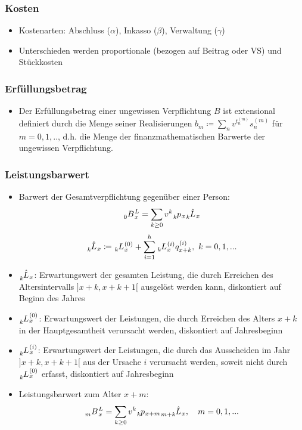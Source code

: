 \documentclass[12pt]{report}
\theoremstyle{dotless}
\theoremstyle{definition}
\begin{document}
\subsubsection{Kosten}
\begin{itemize}
	\item Kostenarten: Abschluss ($\alpha$), Inkasso ($\beta$), Verwaltung ($\gamma$)
	\item Unterschieden werden proportionale (bezogen auf Beitrag oder VS) und Stückkosten
\end{itemize}

\subsubsection{Erfüllungsbetrag}
\begin{itemize}
	\item Der Erfüllungsbetrag einer ungewissen Verpflichtung $B$ ist extensional definiert durch die Menge seiner Realisierungen $b_m \coloneqq \sum_n v^{t_n^{(m)}}s_n^{(m)}$ für $m=0,1,..$, d.h. die Menge der finanzmathematischen Barwerte der ungewissen Verpflichtung.
\end{itemize}

\subsubsection{Leistungsbarwert}
\begin{itemize}
	\item Barwert der Gesamtverpflichtung gegenüber einer Person: 
	\begin{equation}
		\tensor[_{0}]{B}{}_x^{L}= \sum_{k\geq 0}v^k \tensor[_{k}]{p}{}_x \tensor[_{k}]{\hat{L}}{}_x
	\end{equation}
	\begin{equation}
		\tensor[_{k}]{\hat{L}}{}_x \coloneqq	\tensor[_{k}]{L}{}_x^{(0)}+\sum_{i=1}^h \tensor[_{k}]{L}{}_x^{(i)}q_{x+k}^{(i)}, \ k = 0,1,...
	\end{equation}
	\item $\tensor[_{k}]{\hat{L}}{}_x$: Erwartungswert der gesamten Leistung, die durch Erreichen des Altersintervalls $]x+k,x+k+1[$ ausgelöst werden kann, diskontiert auf Beginn des Jahres
	\item $\tensor[_{k}]{L}{}_x^{(0)}$: Erwartungswert der Leistungen, die durch Erreichen des Alters $x+k$ in der Hauptgesamtheit verursacht werden, diskontiert auf Jahresbeginn
	\item $\tensor[_{k}]{L}{}_x^{(i)}$: Erwartungswert der Leistungen, die durch das Ausscheiden im Jahr $]x+k, x+k+1[$ aus der Ursache $i$ verursacht werden, soweit nicht durch $\tensor[_{k}]{L}{}_x^{(0)}$ erfasst, diskontiert auf Jahresbeginn
	\item Leistungsbarwert zum Alter $x+m$:
	\begin{equation}
		\tensor[_{m}]{B}{}_x^{L}=\sum_{k\geq0}v^k \tensor[_{k}]{p}{}_{x+m} \tensor[_{m+k}]{\hat{L}}{}_x, \ \ \  m=0,1,...
	\end{equation}
\end{itemize}
\end{document}

